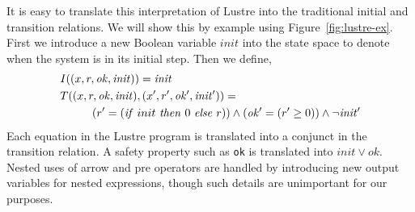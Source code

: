 It is easy to translate this interpretation of Lustre into the
traditional initial and transition relations. We will show this by
example using Figure~\ref{fig:lustre-ex}. First we introduce a new Boolean
variable $init$ into the state space to denote when the system is in
its initial step. Then we define,
\begin{align*}
  &I((x, r, \mathit{ok}, \mathit{init})) = \mathit{init} \\
  &T((x, r, \mathit{ok}, \mathit{init}), (x', r', \mathit{ok'},
  \mathit{init'})) = \\
  &\hspace{1cm} (r' = (\mathit{if}\ init\ \mathit{then}\ 0\ \mathit{else}\ r)) \land (\mathit{ok'} =
  (r' \geq 0)) \land \neg\mathit{init'}
\end{align*}
Each equation in the Lustre program is translated into a conjunct in
the transition relation. A safety property such as {\tt ok} is
translated into $\mathit{init} \lor \mathit{ok}$. Nested uses of arrow
and pre operators are handled by introducing new output variables for
nested expressions, though such details are unimportant for our
purposes.
